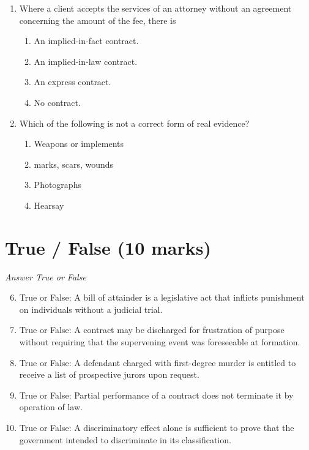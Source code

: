 \documentclass[12pt]{article}
\begin{document}
\begin{enumerate}[label=\arabic*.]
\begin{enumerate}[label=(\alph*)]
\end{enumerate}
\item Where a client accepts the services of an attorney without an agreement concerning the amount of the fee, there is
\begin{enumerate}[label=(\alph*)]
    \item An implied-in-fact contract.
    \item An implied-in-law contract.
    \item An express contract.
    \item No contract.
\end{enumerate}
\item Which of the following is not a correct form of real evidence?
\begin{enumerate}[label=(\alph*)]
    \item Weapons or implements
    \item marks, scars, wounds
    \item Photographs
    \item Hearsay
\end{enumerate}
\end{enumerate}

\section*{True / False (10 marks)}
\textit{Answer True or False}
\begin{enumerate}[label=\arabic*.]
\setcounter{enumi}{5}
\item True or False: A bill of attainder is a legislative act that inflicts punishment on individuals without a judicial trial.
\item True or False: A contract may be discharged for frustration of purpose without requiring that the supervening event was foreseeable at formation.
\item True or False: A defendant charged with first-degree murder is entitled to receive a list of prospective jurors upon request.
\item True or False: Partial performance of a contract does not terminate it by operation of law.
\item True or False: A discriminatory effect alone is sufficient to prove that the government intended to discriminate in its classification.
\end{enumerate}
\end{document}
